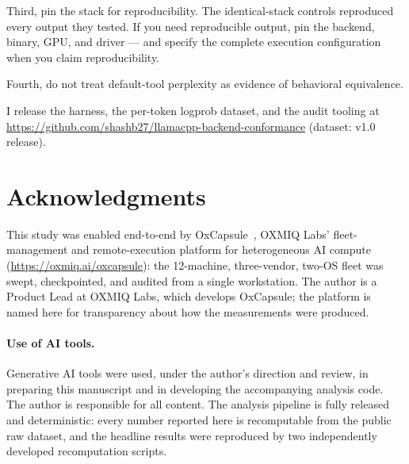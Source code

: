 \documentclass[11pt]{article}
\begin{document}
Third, pin the stack for reproducibility. The identical-stack controls
reproduced every output they tested. If you need reproducible output,
pin the backend, binary, GPU, and driver --- and specify the complete
execution configuration when you claim reproducibility.

Fourth, do not treat default-tool perplexity as evidence of behavioral
equivalence.

I release the harness, the per-token logprob dataset, and the audit
tooling at
\url{https://github.com/shashb27/llamacpp-backend-conformance}
(dataset: v1.0 release).

\section*{Acknowledgments}

This study was enabled end-to-end by OxCapsule~\cite{oxcapsule}, OXMIQ
Labs' fleet-management and remote-execution platform for heterogeneous
AI compute (\url{https://oxmiq.ai/oxcapsule}): the 12-machine,
three-vendor, two-OS fleet was swept, checkpointed, and audited from a
single workstation. The author is a Product Lead at OXMIQ Labs, which
develops OxCapsule; the platform is named here for transparency about
how the measurements were produced.

\paragraph{Use of AI tools.}
Generative AI tools were used, under the author's direction and
review, in preparing this manuscript and in developing the
accompanying analysis code. The author is responsible for all content.
The analysis pipeline is fully released and deterministic: every
number reported here is recomputable from the public raw dataset, and
the headline results were reproduced by two independently developed
recomputation scripts.
\end{document}
